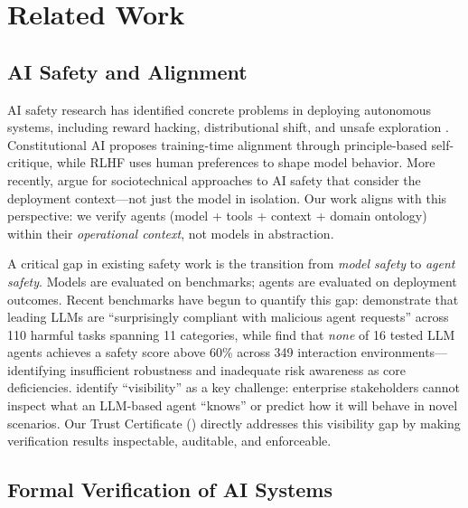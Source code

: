 \documentclass[11pt,a4paper]{article}
\begin{document}
\section{Related Work}
\label{sec:related-work}

\subsection{AI Safety and Alignment}

AI safety research has identified concrete problems in deploying
autonomous systems, including reward hacking, distributional shift,
and unsafe exploration \citep{amodei2016concrete}. Constitutional AI
\citep{bai2022constitutional} proposes training-time alignment through
principle-based self-critique, while RLHF \citep{christiano2017deep}
uses human preferences to shape model behavior. More recently,
\citet{weidinger2023sociotechnical} argue for sociotechnical
approaches to AI safety that consider the deployment context---not
just the model in isolation. Our work aligns with this perspective:
we verify agents (model + tools + context + domain ontology) within
their \emph{operational context}, not models in abstraction.

A critical gap in existing safety work is the transition from
\emph{model safety} to \emph{agent safety}. Models are evaluated on
benchmarks; agents are evaluated on deployment outcomes.
Recent benchmarks have begun to quantify this gap:
\citet{andriushchenko2025agentharm} demonstrate that leading LLMs are
``surprisingly compliant with malicious agent requests'' across 110
harmful tasks spanning 11 categories, while
\citet{zhang2025agentsafetybench} find that \emph{none} of 16 tested
LLM agents achieves a safety score above 60\% across 349 interaction
environments---identifying insufficient robustness and inadequate
risk awareness as core deficiencies.
\citet{chan2024visibility} identify ``visibility'' as a key challenge:
enterprise stakeholders cannot inspect what an LLM-based agent
``knows'' or predict how it will behave in novel scenarios. Our
Trust Certificate () directly
addresses this visibility gap by making verification results
inspectable, auditable, and enforceable.

\subsection{Formal Verification of AI Systems}
\end{document}
